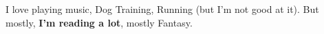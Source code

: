 

\begin{cvparagraph}

I love playing music, Dog Training, Running (but I'm not good at it).
But mostly, \textbf{I'm reading a lot}, mostly Fantasy.

\end{cvparagraph}
